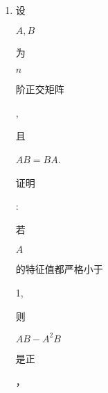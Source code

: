 \documentclass[10pt]{article}
\begin{document}
\begin{enumerate}
  \item \begin{CJK}{UTF8}{mj}设\end{CJK} $A, B$ \begin{CJK}{UTF8}{mj}为\end{CJK} $n$ \begin{CJK}{UTF8}{mj}阶正交矩阵\end{CJK}, \begin{CJK}{UTF8}{mj}且\end{CJK} $A B=B A$. \begin{CJK}{UTF8}{mj}证明\end{CJK}: \begin{CJK}{UTF8}{mj}若\end{CJK} $A$ \begin{CJK}{UTF8}{mj}的特征值都严格小于\end{CJK} 1, \begin{CJK}{UTF8}{mj}则\end{CJK} $A B-A^{2} B$ \begin{CJK}{UTF8}{mj}是正\end{CJK}，


\end{enumerate}
\end{document}
